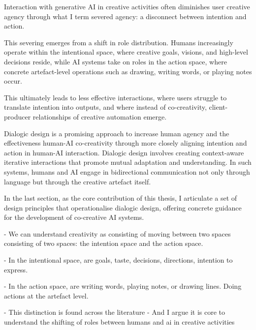 
Interaction with generative AI in creative activities often diminishes user creative agency through what I term severed agency: a disconnect between intention and action. 

This severing emerges from a shift in role distribution. Humans increasingly operate within the intentional space, where creative goals, visions, and high-level decisions reside, while AI systems take on roles in the action space, where concrete artefact-level operations such as drawing, writing words, or playing notes occur. 

This ultimately leads to less effective interactions, where users struggle to translate intention into outputs, and where instead of co-creativity, client-producer relationships of creative automation emerge.

Dialogic design is a promising approach to increase human agency and the effectiveness human-AI co-creativity through more closely aligning intention and action in human-AI interaction. Dialogic design involves creating context-aware iterative interactions that promote mutual adaptation and understanding. In such systems, humans and AI engage in bidirectional communication not only through language but through the creative artefact itself. 

In the last section, as the core contribution of this thesis, I articulate a set of design principles that operationalise dialogic design, offering concrete guidance for the development of co-creative AI systems.




- We can understand creativity as consisting of moving between two spaces consisting of two spaces: the intention space and the action space.

- In the intentional space, are goals, taste, decisions, directions, intention to express. 

- In the action space, are writing words, playing notes, or drawing lines. Doing actions at the artefact level. 

- This distinction is found across the literature \cite{Palani2024-on}
- And I argue it is core to understand the shifting of roles between humans and ai in creative activities

